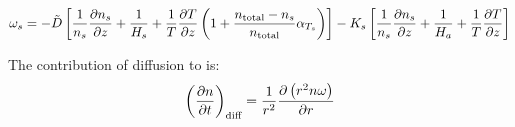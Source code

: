 \begin{equation}
\omega_s = -\tilde{D} \left[\frac{1}{n_s}\frac{\partial n_s}{\partial z} + \frac{1}{H_s} + 
                                \frac{1}{T}\frac{\partial T}{\partial z}\left(1 + \frac{n_\text{total} - n_s}{n_\text{total}}\alpha_{T_s}\right)\right] - 
                  K_s \left[\frac{1}{n_s}\frac{\partial n_s}{\partial z} + \frac{1}{H_a} + \frac{1}{T}\frac{\partial T}{\partial z}\right]
\label{Titan:omega_diff}
\end{equation}

The contribution of diffusion to  is:
\begin{equation}
\left(\frac{\partial n}{\partial t}\right)_{\text{diff}} = \frac{1}{r^2}\frac{\partial\left(r^2n\omega\right)}{\partial r}
\end{equation}
